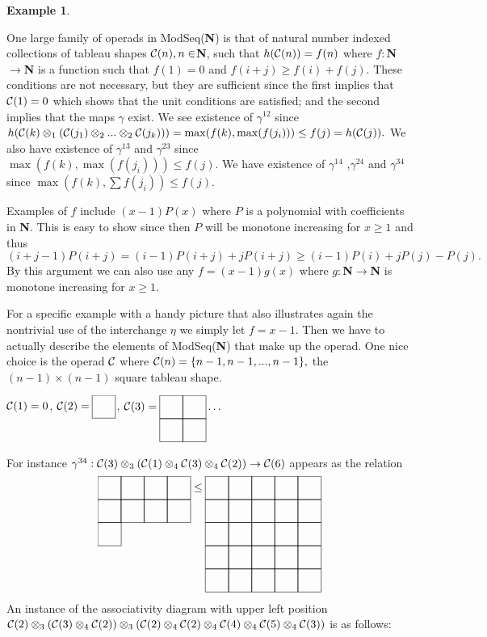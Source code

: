 \documentclass{tac}
\newtheorem{example}{Example}
\begin{document}
{      \begin{example}
      ~
      \end{example}
      One large family of operads in ModSeq({\bf N}) is that of natural number indexed collections of tableau shapes
       ${\cal C}(n), n\in${\bf N}, such that
      $h({\cal C}(n)) = f(n)$ where $f:${\bf N}$\to${\bf N} is a function such 
      that $f(1) = 0$ and $f(i+j)\ge f(i) + f(j).$
      These conditions are not necessary, but they are sufficient since the first implies that ${\cal C}(1) =0$ which shows that the
      unit conditions are satisfied; and the second implies that the maps $\gamma$ exist.
      We see existence of $\gamma^{12}$ since 
      $h({\cal C}(k)\otimes_1({\cal C}(j_1)\otimes_2...\otimes_2{\cal C}(j_k))) =\max(f(k),\max(f(j_i))) \le f(j)  =h({\cal C}(j)).$
      We also have existence of $\gamma^{13}$ and $\gamma^{23}$ since $\max(f(k),\max(f(j_i))) \le f(j).$
      We have existence of $\gamma^{14}$ ,$\gamma^{24}$ and $\gamma^{34}$ since
      $ \max(f(k), \sum{f(j_i)}) \le f(j)$.  
      

      
      Examples of $f$ include  $(x-1)P(x)$ where $P$ is a polynomial with coefficients in {\bf N}. This is easy to show
      since then $P$ will be monotone increasing for 
      $x\ge 1$ and thus $(i+j-1)P(i+j) = (i-1)P(i+j)+jP(i+j) \ge (i-1)P(i)+jP(j) - P(j).$
      By this argument we can also use any $f= (x-1)g(x)$ where $g:${\bf N}$\to${\bf N} is monotone  increasing 
      for $x \ge 1.$
      
      For a specific example with a 
      handy picture that also illustrates again the nontrivial use of the interchange $\eta$
      we simply let $f = x-1.$ Then we have to actually describe the elements of ModSeq({\bf N}) that make up the
      operad. One nice choice is the operad ${\cal C}$ where ${\cal C}(n) = \{n-1,n-1,...,n-1\},$ the  
      $(n-1)\times (n-1)$ square tableau shape. 
      
      ${\cal C}(1) = 0$, ${\cal C}(2) = \xymatrix@W=1.2pc @H=1.2pc @R=0pc @C=0pc @*[F-]{~}$, 
      ${\cal C}(3) = \xymatrix@W=1.2pc @H=1.2pc @R=0pc @C=0pc @*[F-]{~&~\\~&~} \dots$
      
      For instance $\gamma^{34}:{\cal C}(3)\otimes_3 ({\cal C}(1)\otimes_4{\cal C}(3)\otimes_4{\cal C}(2)) \to {\cal C}(6)$
      appears as the relation
      $$
      \xymatrix@W=1.2pc @H=1.2pc @R=0pc @C=0pc @*[F-]{~&~&~&~\\~&~&~&~\\~} \le \xymatrix@W=1.2pc @H=1.2pc @R=0pc @C=0pc @*[F-]{~&~&~&~&~\\~&~&~&~&~\\~&~&~&~&~\\~&~&~&~&~\\~&~&~&~&~}
      $$
      An instance of the associativity diagram with upper left position 
      ${\cal C}(2)\otimes_3({\cal C}(3)\otimes_4{\cal C}(2))\otimes_3
      ({\cal C}(2)\otimes_4{\cal C}(2)\otimes_4{\cal C}(4)\otimes_4{\cal C}(5)\otimes_4{\cal C}(3))$ is as follows:
      
}
\end{document}
